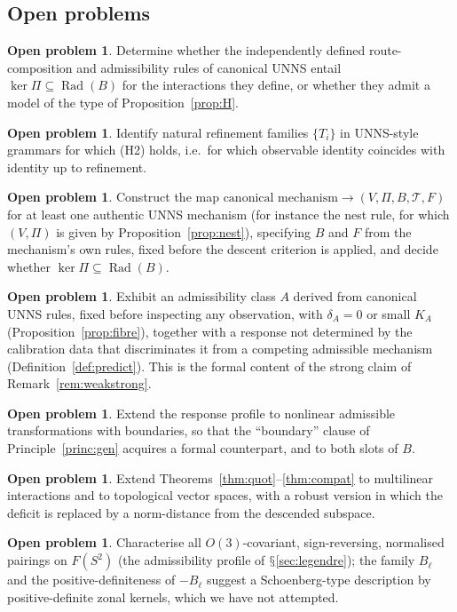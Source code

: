\documentclass[11pt,a4paper]{article}
\renewcommand{\S}{\ensuremath{\mathsection}}
\newcommand{\Rad}{\operatorname{Rad}}
\newcommand{\defic}{\delta}
\theoremstyle{plain}
\theoremstyle{definition}
\newtheorem{problem}[theorem]{Open problem}
\begin{document}
\subsection{Open problems}
\begin{problem}\label{prob:entail}
Determine whether the independently defined route-composition and admissibility rules of canonical UNNS entail $\ker\Pi\subseteq\Rad(B)$ for the interactions they define, or whether they admit a model of the type of Proposition~\ref{prop:H}.
\end{problem}
\begin{problem}
Identify natural refinement families $\{T_i\}$ in UNNS-style grammars for which (H2) holds, i.e.\ for which observable identity coincides with identity up to refinement.
\end{problem}
\begin{problem}\label{prob:bridge}
Construct the map $\text{canonical mechanism}\to(V,\Pi,B,\mathcal T,F)$ for at least one authentic UNNS mechanism (for instance the nest rule, for which $(V,\Pi)$ is given by Proposition~\ref{prop:nest}), specifying $B$ and $F$ from the mechanism's own rules, fixed before the descent criterion is applied, and decide whether $\ker\Pi\subseteq\Rad(B)$.
\end{problem}
\begin{problem}\label{prob:strong}
Exhibit an admissibility class $A$ derived from canonical UNNS rules, fixed before inspecting any observation, with $\defic_A=0$ or small $K_A$ (Proposition~\ref{prop:fibre}), together with a response not determined by the calibration data that discriminates it from a competing admissible mechanism (Definition~\ref{def:predict}). This is the formal content of the strong claim of Remark~\ref{rem:weakstrong}.
\end{problem}
\begin{problem}
Extend the response profile to nonlinear admissible transformations with boundaries, so that the ``boundary'' clause of Principle~\ref{princ:gen} acquires a formal counterpart, and to both slots of $B$.
\end{problem}
\begin{problem}
Extend Theorems~\ref{thm:quot}--\ref{thm:compat} to multilinear interactions and to topological vector spaces, with a robust version in which the deficit is replaced by a norm-distance from the descended subspace.
\end{problem}
\begin{problem}
Characterise all $O(3)$-covariant, sign-reversing, normalised pairings on $F(S^2)$ (the admissibility profile of \S\ref{sec:legendre}); the family $B_\ell$ and the positive-definiteness of $-B_\ell$ suggest a Schoenberg-type description by positive-definite zonal kernels, which we have not attempted.
\end{problem}
\end{document}

